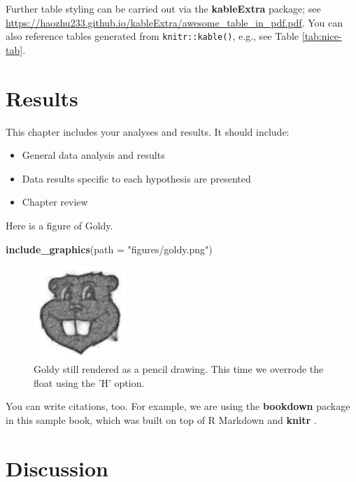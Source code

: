 \documentclass[12pt,letterpaper,oneside,oldfontcommands]{memoir}
\newenvironment{Shaded}{\begin{snugshade}}{\end{snugshade}}
\newcommand{\DataTypeTok}[1]{\textcolor[rgb]{0.13,0.29,0.53}{#1}}
\newcommand{\KeywordTok}[1]{\textcolor[rgb]{0.13,0.29,0.53}{\textbf{#1}}}
\newcommand{\NormalTok}[1]{#1}
\newcommand{\StringTok}[1]{\textcolor[rgb]{0.31,0.60,0.02}{#1}}
\providecommand{\tightlist}{%
  \setlength{\itemsep}{0pt}\setlength{\parskip}{0pt}}
\theoremstyle{definition}
\theoremstyle{definition}
\theoremstyle{definition}
\theoremstyle{remark}
\begin{document}
Further table styling can be carried out via the \textbf{kableExtra}
package; see
\url{https://haozhu233.github.io/kableExtra/awesome_table_in_pdf.pdf}.
You can also reference tables generated from \texttt{knitr::kable()},
e.g., see Table \ref{tab:nice-tab}.

\clearpage

\hypertarget{results}{%
\chapter{Results}\label{results}}

This chapter includes your analyses and results. It should include:

\begin{itemize}
\tightlist
\item
  General data analysis and results
\item
  Data results specific to each hypothesis are presented
\item
  Chapter review
\end{itemize}

Here is a figure of Goldy.

\begin{Shaded}
\begin{Highlighting}[]
\KeywordTok{include_graphics}\NormalTok{(}\DataTypeTok{path =} \StringTok{"figures/goldy.png"}\NormalTok{)}
\end{Highlighting}
\end{Shaded}

\begin{figure}[H]
\includegraphics[width=1.39in]{figures/goldy} \caption{Goldy still rendered as a pencil drawing. This time we overrode the float using the 'H' option.}\label{fig:goldy2}
\end{figure}

You can write citations, too. For example, we are using the
\textbf{bookdown} package \citep{R-bookdown} in this sample book, which
was built on top of R Markdown and \textbf{knitr} \citep{xie2015}.

\clearpage

\hypertarget{discussion}{%
\chapter{Discussion}\label{discussion}}
\end{document}
